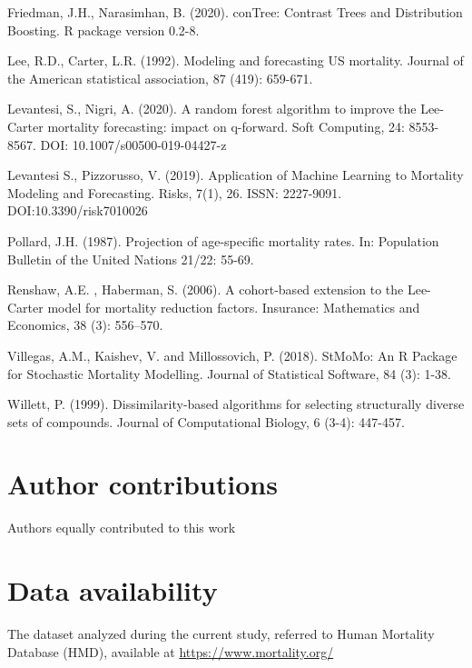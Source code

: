 \documentclass[fleqn,10pt]{wlscirep}
\begin{document}
\begin{thebibliography}{99}
Friedman, J.H., Narasimhan, B. (2020). conTree: Contrast Trees and Distribution Boosting. R package version 0.2-8.

Lee, R.D., Carter, L.R. (1992). Modeling and forecasting US mortality. Journal of the American statistical association, 87 (419): 659-671.

Levantesi, S., Nigri, A. (2020). A random forest algorithm to improve the Lee-Carter mortality forecasting: impact on q-forward. Soft Computing, 24: 8553-8567. DOI: 10.1007/s00500-019-04427-z

Levantesi S., Pizzorusso, V. (2019). Application of Machine Learning to Mortality Modeling and Forecasting. Risks, 7(1), 26. ISSN: 2227-9091. DOI:10.3390/risk7010026

Pollard, J.H. (1987). Projection of age-specific mortality rates. In: Population Bulletin of the United Nations 21/22: 55-69.

Renshaw, A.E. , Haberman, S. (2006). A cohort-based extension to the Lee-Carter model for mortality reduction factors. Insurance: Mathematics and Economics, 38 (3): 556–570.

Villegas, A.M., Kaishev, V. and Millossovich, P. (2018). StMoMo: An R Package for Stochastic Mortality Modelling. Journal of Statistical Software, 84 (3): 1-38.

Willett, P. (1999). Dissimilarity-based algorithms for selecting structurally diverse sets of compounds. Journal of Computational Biology, 6 (3-4): 447-457.
 
\end{thebibliography}


\section*{Author contributions}
Authors equally contributed to this work

\section*{Data availability}
The dataset analyzed during the current study, referred to Human Mortality Database (HMD), available at \url{https://www.mortality.org/}
\end{document}
